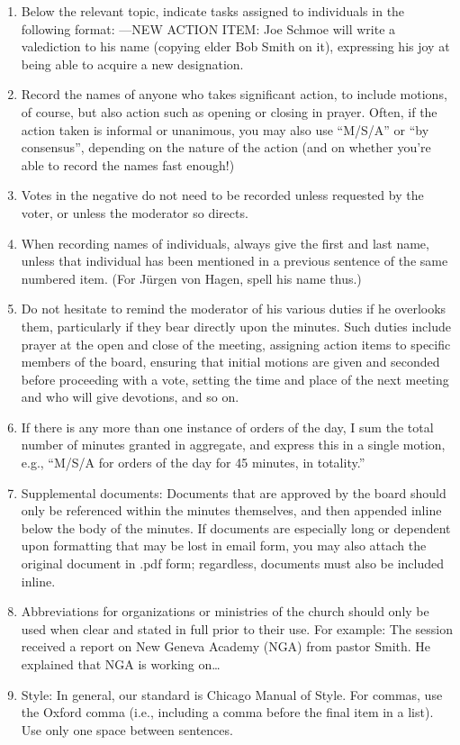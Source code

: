 \documentclass[
]{book}
\begin{document}
\begin{enumerate}
\def\labelenumi{\arabic{enumi}.}
\setcounter{enumi}{7}
\item
  Below the relevant topic, indicate tasks assigned to individuals in the following format:
  ---NEW ACTION ITEM: Joe Schmoe will write a valediction to his name (copying elder Bob Smith on it), expressing his joy at being able to acquire a new designation.
\item
  Record the names of anyone who takes significant action, to include motions, of course, but also action such as opening or closing in prayer. Often, if the action taken is informal or unanimous, you may also use ``M/S/A'' or ``by consensus'', depending on the nature of the action (and on whether you're able to record the names fast enough!)
\item
  Votes in the negative do not need to be recorded unless requested by the voter, or unless the moderator so directs.
\item
  When recording names of individuals, always give the first and last name, unless that individual has been mentioned in a previous sentence of the same numbered item. (For Jürgen von Hagen, spell his name thus.)
\item
  Do not hesitate to remind the moderator of his various duties if he overlooks them, particularly if they bear directly upon the minutes. Such duties include prayer at the open and close of the meeting, assigning action items to specific members of the board, ensuring that initial motions are given and seconded before proceeding with a vote, setting the time and place of the next meeting and who will give devotions, and so on.
\item
  If there is any more than one instance of orders of the day, I sum the total number of minutes granted in aggregate, and express this in a single motion, e.g., ``M/S/A for orders of the day for 45 minutes, in totality.''
\item
  Supplemental documents: Documents that are approved by the board should only be referenced within the minutes themselves, and then appended inline below the body of the minutes. If documents are especially long or dependent upon formatting that may be lost in email form, you may also attach the original document in .pdf form; regardless, documents must also be included inline.
\item
  Abbreviations for organizations or ministries of the church should only be used when clear and stated in full prior to their use. For example: The session received a report on New Geneva Academy (NGA) from pastor Smith. He explained that NGA is working on\ldots{}
\item
  Style: In general, our standard is Chicago Manual of Style. For commas, use the Oxford comma (i.e., including a comma before the final item in a list). Use only one space between sentences.
\end{enumerate}
\end{document}
